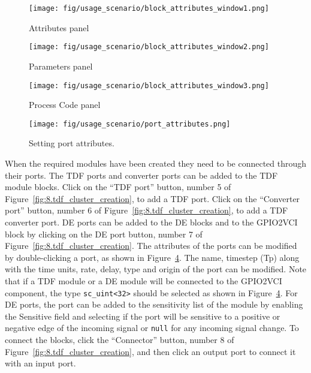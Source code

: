 \begin{figure}[h]
    \centering     
         \texttt{[image: fig/usage\_scenario/block\_attributes\_window1.png]}
         \caption{Attributes panel}
         \label{fig:8.block_attributes_window1}
     \end{figure}

  \begin{figure}[h]
         \centering
         \texttt{[image: fig/usage\_scenario/block\_attributes\_window2.png]}
         \caption{Parameters panel}
         \label{fig:8.block_attributes_window2}
     \end{figure}
    

\begin{figure}[h]
         \centering
         \texttt{[image: fig/usage\_scenario/block\_attributes\_window3.png]}
         \caption{Process Code panel}
         \label{fig:8.block_attributes_window3}
\end{figure}

\begin{figure}[h]
    \centering
    \texttt{[image: fig/usage\_scenario/port\_attributes.png]}
    \caption{Setting port attributes.}
    \label{fig:8.port_attributes}
\end{figure}

When the required modules have been created they need to be connected through their ports. The TDF ports and converter ports can be added to the TDF module blocks. Click on the ``TDF port'' button, number 5 of Figure~\ref{fig:8.tdf_cluster_creation}, to add a TDF port. Click on the ``Converter port'' button, number 6 of Figure~\ref{fig:8.tdf_cluster_creation}, to add a TDF converter port. DE ports can be added to the DE blocks and to the GPIO2VCI block by clicking on the DE port button, number 7 of Figure~\ref{fig:8.tdf_cluster_creation}. The attributes of the ports can be modified by double-clicking a port, as shown in Figure~\ref{fig:8.port_attributes}. The name, timestep (Tp) along with the time units, rate, delay, type and origin of the port can be modified. Note that if a TDF module or a DE module will be connected to the GPIO2VCI component, the type \texttt{sc\_uint<32>} should be selected as shown in Figure~\ref{fig:8.port_attributes}.
For DE ports, the port can be added to the sensitivity list of the module by enabling the Sensitive field and selecting if the port will be sensitive to a positive or negative edge of the incoming signal or \texttt{null} for any incoming signal change.
To connect the blocks, click the ``Connector'' button, number 8 of  Figure~\ref{fig:8.tdf_cluster_creation}, and then click an output port to connect it with an input port. 


